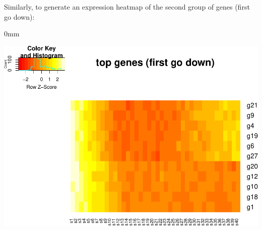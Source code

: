 \documentclass{article}
\begin{document}
Similarly, to generate an expression heatmap of the second group of genes 
(first go down):
\begin{knitrout}
\color{fgcolor}\begin{kframe}
\begin{alltt}
\hlstd{(TrendyExampleData[}\hlopt{$}\hlstd{firstdown),],}
  \hlstd{=}\hlstd{,} \hlstd{=}\hlstd{,}\hlstd{=}\hlstd{,}
        \hlstd{=}\hlstd{,} \hlstd{=}\hlstd{)}
\end{alltt}
\end{kframe}\begin{adjustwidth}{\fltoffset}{0mm}

{\centering \includegraphics[width=.8\textwidth]{figure/unnamed-chunk-8-1} 

}

\end{adjustwidth}
\end{knitrout}
\end{document}
